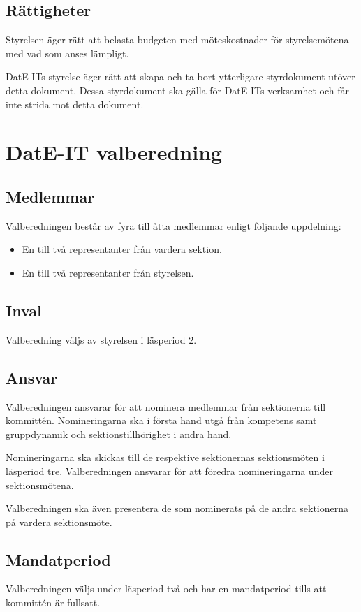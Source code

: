 \documentclass{article}
\begin{document}
\subsection{Rättigheter}
Styrelsen äger rätt att belasta budgeten med möteskostnader för styrelsemötena med vad som anses lämpligt.

DatE-ITs styrelse äger rätt att skapa och ta bort ytterligare styrdokument utöver detta dokument. Dessa styrdokument ska gälla för DatE-ITs verksamhet och får inte strida mot detta dokument.

\section{DatE-IT valberedning} \label{komm_valb}

\subsection{Medlemmar}
Valberedningen består av fyra till åtta medlemmar enligt följande uppdelning:
\begin{itemize}
    \item En till två representanter från vardera sektion.
    \item En till två representanter från styrelsen.
\end{itemize}

\subsection{Inval}
Valberedning väljs av styrelsen i läsperiod 2.

\subsection{Ansvar}
Valberedningen ansvarar för att nominera medlemmar från sektionerna till kommittén. Nomineringarna ska i första hand utgå från kompetens samt gruppdynamik och sektionstillhörighet i andra hand.

Nomineringarna ska skickas till de respektive sektionernas sektionsmöten i läsperiod tre. Valberedningen ansvarar för att föredra nomineringarna under sektionsmötena.

Valberedningen ska även presentera de som nominerats på de andra sektionerna på vardera sektionsmöte. 

\subsection{Mandatperiod}
Valberedningen väljs under läsperiod två och har en mandatperiod tills att kommittén är fullsatt.
\end{document}
